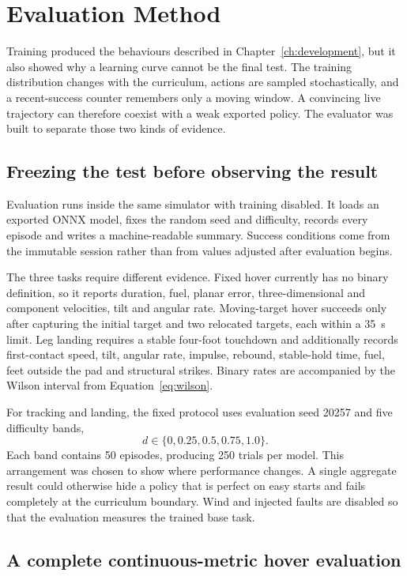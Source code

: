 \chapter{Evaluation Method}
\label{ch:evaluation}

Training produced the behaviours described in Chapter~\ref{ch:development}, but it also showed
why a learning curve cannot be the final test. The training distribution changes with the
curriculum, actions are sampled stochastically, and a recent-success counter remembers only a
moving window. A convincing live trajectory can therefore coexist with a weak exported policy.
The evaluator was built to separate those two kinds of evidence.

\section{Freezing the test before observing the result}

Evaluation runs inside the same simulator with training disabled. It loads an exported ONNX
model, fixes the random seed and difficulty, records every episode and writes a machine-readable
summary. Success conditions come from the immutable session rather than from values adjusted
after evaluation begins.

The three tasks require different evidence. Fixed hover currently has no binary definition, so
it reports duration, fuel, planar error, three-dimensional and component velocities, tilt and
angular rate. Moving-target hover succeeds only after capturing the initial target and two
relocated targets, each within a \SI{35}{s} limit. Leg landing requires a stable four-foot
touchdown and additionally records first-contact speed, tilt, angular rate, impulse, rebound,
stable-hold time, fuel, feet outside the pad and structural strikes. Binary rates are accompanied
by the Wilson interval from Equation~\eqref{eq:wilson}.

For tracking and landing, the fixed protocol uses evaluation seed 20257 and five difficulty
bands,
\[
  d\in\{0,0.25,0.5,0.75,1.0\}.
\]
Each band contains 50 episodes, producing 250 trials per model. This arrangement was chosen to
show where performance changes. A single aggregate result could otherwise hide a policy that is
perfect on easy starts and fails completely at the curriculum boundary. Wind and injected
faults are disabled so that the evaluation measures the trained base task.

\section{A complete continuous-metric hover evaluation}

